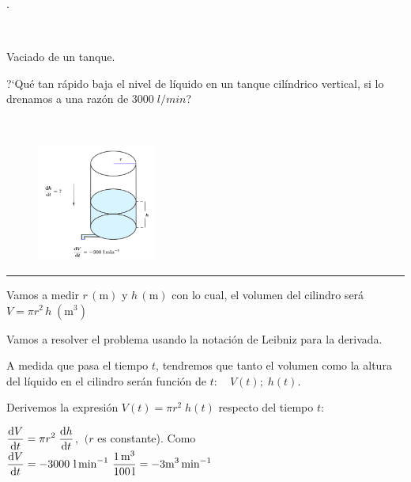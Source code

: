 \vspace{1cm}
\begin{miejercicio}
.	
\begin{multicols}{2}
	$\quad$
	
	Vaciado de un tanque.
	
	\begin{adjustwidth}{20pt}{5pt}
		?`Qué tan rápido baja el nivel de líquido en un tanque cilíndrico vertical, si lo drenamos a una razón de $3000 \; l/min$?	
	\end{adjustwidth}
	$\quad$
	
	\begin{figure}[H]
	\centering
	\includegraphics[width=0.35\textwidth]{imagenes/T02IM05.png}
	\end{figure}
\end{multicols}

\vspace{-10mm}
\color{teal!80}
\rule{200pt}{0.2pt}
\color{black}
\vspace{5mm}

Vamos a medir $r\,(\mathrm{m})$ y $h\,(\mathrm{m})$ con lo cual, el volumen del cilindro será $V=\pi r^2\, h \; (\mathrm{m}^3) $
	
\vspace{3mm}Vamos a resolver el problema usando la notación de Leibniz para la derivada.
	
\vspace{3mm}A medida que pasa el tiempo $t$, tendremos que tanto el volumen como la altura del líquido en el cilindro serán función de $t: \quad V(t); \; h(t)$.
	
\vspace{3mm}Derivemos la expresión 	$V(t)= \pi r^2 \; h(t)$ respecto del tiempo $t$:
	
\vspace{3mm}$\displaystyle \dv {V}{t}= \pi r^2\; \dv {h}{t}$, $\ (r$ es constante). Como $\displaystyle  \dv {V}{t}=-3000 \ \mathrm{l\, min}^{-1} \ \dfrac{1\, \mathrm{m}^3}{100 \, \mathrm{l}}= -3 \mathrm{m}^3\,\mathrm{min}^{-1} $
	

\end{miejercicio}
